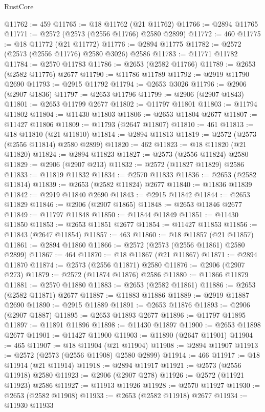 \begin{lexlean}{RustCore}
\begin{coremodule}
@11762 := 459
@11765 := @18 @11762 (@21 @11762)
@11766 := @2894 @11765
@11771 := @2572 (@2573 (@2556 @11766) @2580 @2899)
@11772 := 460
@11775 := @18 @11772 (@21 @11772)
@11776 := @2894 @11775
@11782 := @2572 (@2573 (@2556 @11776) @2580 @3026) @2586
@11783 := @11771 @11782
@11784 := @2570 @11783
@11786 := @2653 (@2582 @11766)
@11789 := @2653 (@2582 @11776) @2677
@11790 := @11786 @11789
@11792 := @2919 @11790 @2690
@11793 := @2915 @11792
@11794 := @2653 @3026
@11796 := @2906 (@2907 @1836)
@11797 := @2653 @11796
@11799 := @2906 (@2907 @1843)
@11801 := @2653 @11799 @2677
@11802 := @11797 @11801
@11803 := @11794 @11802
@11804 := @11430 @11803
@11806 := @2653 @11804 @2677
@11807 := @11427 @11806
@11809 := @11793 (@2647 @11807)
@11810 := 461
@11813 := @18 @11810 (@21 @11810)
@11814 := @2894 @11813
@11819 := @2572 (@2573 (@2556 @11814) @2580 @2899)
@11820 := 462
@11823 := @18 @11820 (@21 @11820)
@11824 := @2894 @11823
@11827 := @2573 (@2556 @11824) @2580
@11829 := @2906 (@2907 @213)
@11832 := @2572 (@11827 @11829) @2586
@11833 := @11819 @11832
@11834 := @2570 @11833
@11836 := @2653 (@2582 @11814)
@11839 := @2653 (@2582 @11824) @2677
@11840 := @11836 @11839
@11842 := @2919 @11840 @2690
@11843 := @2915 @11842
@11844 := @2653 @11829
@11846 := @2906 (@2907 @1865)
@11848 := @2653 @11846 @2677
@11849 := @11797 @11848
@11850 := @11844 @11849
@11851 := @11430 @11850
@11853 := @2653 @11851 @2677
@11854 := @11427 @11853
@11856 := @11843 (@2647 @11854)
@11857 := 463
@11860 := @18 @11857 (@21 @11857)
@11861 := @2894 @11860
@11866 := @2572 (@2573 (@2556 @11861) @2580 @2899)
@11867 := 464
@11870 := @18 @11867 (@21 @11867)
@11871 := @2894 @11870
@11874 := @2573 (@2556 @11871) @2580
@11876 := @2906 (@2907 @273)
@11879 := @2572 (@11874 @11876) @2586
@11880 := @11866 @11879
@11881 := @2570 @11880
@11883 := @2653 (@2582 @11861)
@11886 := @2653 (@2582 @11871) @2677
@11887 := @11883 @11886
@11889 := @2919 @11887 @2690
@11890 := @2915 @11889
@11891 := @2653 @11876
@11893 := @2906 (@2907 @1887)
@11895 := @2653 @11893 @2677
@11896 := @11797 @11895
@11897 := @11891 @11896
@11898 := @11430 @11897
@11900 := @2653 @11898 @2677
@11901 := @11427 @11900
@11903 := @11890 (@2647 @11901)
@11904 := 465
@11907 := @18 @11904 (@21 @11904)
@11908 := @2894 @11907
@11913 := @2572 (@2573 (@2556 @11908) @2580 @2899)
@11914 := 466
@11917 := @18 @11914 (@21 @11914)
@11918 := @2894 @11917
@11921 := @2573 (@2556 @11918) @2580
@11923 := @2906 (@2907 @278)
@11926 := @2572 (@11921 @11923) @2586
@11927 := @11913 @11926
@11928 := @2570 @11927
@11930 := @2653 (@2582 @11908)
@11933 := @2653 (@2582 @11918) @2677
@11934 := @11930 @11933

\end{coremodule}
\end{lexlean}

